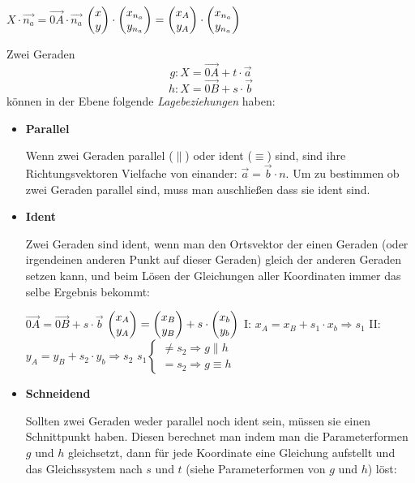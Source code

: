 \begin{center}
  $X \cdot \vec{n_{a}} = \vec{0A} \cdot \vec{n_{a}}$
  \extrapar
  $\begin{pmatrix}x\\y\end{pmatrix} \cdot \begin{pmatrix}x_{n_{a}}\\y_{n_{a}}\end{pmatrix} = \begin{pmatrix}x_{A} \\ y_{A}\end{pmatrix} \cdot \begin{pmatrix}x_{n_{a}}\\y_{n_{a}}\end{pmatrix}$
\end{center}


Zwei Geraden $$g: X = \vec{0A} + t \cdot \vec{a}$$ $$h: X = \vec{0B} + s \cdot \vec{b}$$ k\"{o}nnen in der Ebene folgende \emph{Lagebeziehungen} haben:

\begin{itemize}
  \item \textbf{Parallel}
  \par
  Wenn zwei Geraden parallel ($\parallel$) oder ident ($\equiv$) sind, sind ihre Richtungsvektoren Vielfache von einander: $\vec{a} = \vec{b} \cdot n$. Um zu bestimmen ob zwei Geraden parallel sind, muss man auschlie\ss{}en dass sie ident sind.

\pagebreak

  \item \textbf{Ident}
  \par
  Zwei Geraden sind ident, wenn man den Ortsvektor der einen Geraden (oder irgendeinen anderen Punkt auf dieser Geraden) gleich der anderen Geraden setzen kann, und beim L\"{o}sen der Gleichungen aller Koordinaten immer das selbe Ergebnis bekommt:

  \begin{center}
    $\vec{0A} = \vec{0B} + s \cdot \vec{b}$
    \extrapar
    $\begin{pmatrix}x_{A}\\y_{A}\end{pmatrix} = \begin{pmatrix}x_{B}\\y_{B}\end{pmatrix} + s \cdot \begin{pmatrix}x_{b}\\y_{b}\end{pmatrix}$
    \extrapar
    I: $x_{A} = x_{B} + s_{1} \cdot x_{b} \Rightarrow s_{1}$
    \extrapar
    II: $y_{A} = y_{B} + s_{2} \cdot y_{b} \Rightarrow s_{2}$
    \extrapar
    $
      s_{1}
      \begin{cases}
        \neq s_{2} \Rightarrow g \parallel h\\
        = s_{2} \Rightarrow g \equiv h
      \end{cases}
    $
  \end{center}

\item \textbf{Schneidend}
  \par
  Sollten zwei Geraden weder parallel noch ident sein, m\"{u}ssen sie einen Schnittpunkt haben. Diesen berechnet man indem man die Parameterformen $g$ und $h$ gleichsetzt, dann f\"{u}r jede Koordinate eine Gleichung aufstellt und das Gleichssystem nach $s$ und $t$ (siehe Parameterformen von $g$ und $h$) l\"{o}st:


\end{itemize}
